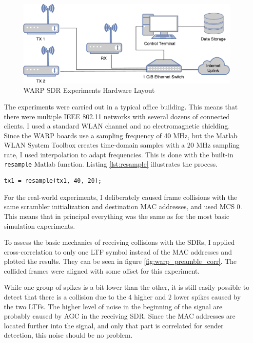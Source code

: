 \begin{figure}[H]
	\centering
	\includegraphics[width=\textwidth]{gfx/images/warp-layout}
	\caption{WARP SDR Experiments Hardware Layout}
	\label{fig:warp-layout}
\end{figure}

The experiments were carried out in a typical office building. This means that there were multiple IEEE 802.11 networks with several dozens of connected clients. I used a standard WLAN channel and no electromagnetic shielding.\\

Since the \gls{WARP} boards use a sampling frequency of 40 MHz, but the Matlab WLAN System Toolbox creates time-domain samples with a 20 MHz sampling rate, I used interpolation to adapt frequencies. This is done with the built-in \texttt{resample} Matlab function. Listing \ref{lst:resample} illustrates the process.

\begin{lstlisting}[captionpos=b,caption={Interpolate Sampling Rate},label=lst:resample]
% Interpolate to get from 20 to 40 MHz sampling rate
tx1 = resample(tx1, 40, 20);
\end{lstlisting}

For the real-world experiments, I deliberately caused frame collisions with the same scrambler initialization and destination \gls{MAC} addresses, and used \gls{MCS} 0. This means that in principal everything was the same as for the most basic simulation experiments.

To assess the basic mechanics of receiving collisions with the \glspl{SDR}, I applied cross-correlation to only one \gls{LTF} symbol instead of the \gls{MAC} addresses and plotted the results. They can be seen in figure \ref{fig:warp_preamble_corr}. The collided frames were aligned with some offset for this experiment.

While one group of spikes is a bit lower than the other, it is still easily possible to detect that there is a collision due to the 4 higher and 2 lower spikes caused by the two \glspl{LTF}. The higher level of noise in the beginning of the signal are probably caused by \gls{AGC} in the receiving \gls{SDR}. Since the \gls{MAC} addresses are located further into the signal, and only that part is correlated for sender detection, this noise should be no problem.

